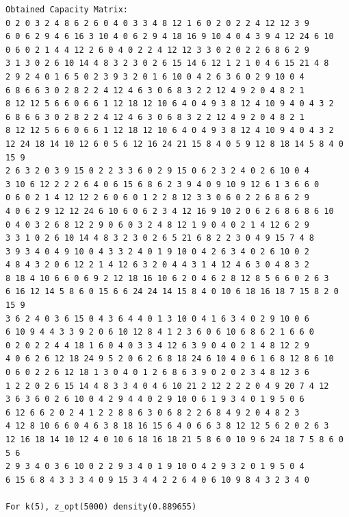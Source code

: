 \documentclass[11pt]{article}
\begin{document}
\begin{lstlisting}
Obtained Capacity Matrix:
0 2 0 3 2 4 8 6 2 6 0 4 0 3 3 4 8 12 1 6 0 2 0 2 2 4 12 12 3 9
6 0 6 2 9 4 6 16 3 10 4 0 6 2 9 4 18 16 9 10 4 0 4 3 9 4 12 24 6 10
0 6 0 2 1 4 4 12 2 6 0 4 0 2 2 4 12 12 3 3 0 2 0 2 2 6 8 6 2 9
3 1 3 0 2 6 10 14 4 8 3 2 3 0 2 6 15 14 6 12 1 2 1 0 4 6 15 21 4 8
2 9 2 4 0 1 6 5 0 2 3 9 3 2 0 1 6 10 0 4 2 6 3 6 0 2 9 10 0 4
6 8 6 6 3 0 2 8 2 2 4 12 4 6 3 0 6 8 3 2 2 12 4 9 2 0 4 8 2 1
8 12 12 5 6 6 0 6 6 1 12 18 12 10 6 4 0 4 9 3 8 12 4 10 9 4 0 4 3 2
6 8 6 6 3 0 2 8 2 2 4 12 4 6 3 0 6 8 3 2 2 12 4 9 2 0 4 8 2 1
8 12 12 5 6 6 0 6 6 1 12 18 12 10 6 4 0 4 9 3 8 12 4 10 9 4 0 4 3 2
12 24 18 14 10 12 6 0 5 6 12 16 24 21 15 8 4 0 5 9 12 8 18 14 5 8 4 0 15 9
2 6 3 2 0 3 9 15 0 2 2 3 3 6 0 2 9 15 0 6 2 3 2 4 0 2 6 10 0 4
3 10 6 12 2 2 2 6 4 0 6 15 6 8 6 2 3 9 4 0 9 10 9 12 6 1 3 6 6 0
0 6 0 2 1 4 12 12 2 6 0 6 0 1 2 2 8 12 3 3 0 6 0 2 2 6 8 6 2 9
4 0 6 2 9 12 12 24 6 10 6 0 6 2 3 4 12 16 9 10 2 0 6 2 6 8 6 8 6 10
0 4 0 3 2 6 8 12 2 9 0 6 0 3 2 4 8 12 1 9 0 4 0 2 1 4 12 6 2 9
3 3 1 0 2 6 10 14 4 8 3 2 3 0 2 6 5 21 6 8 2 2 3 0 4 9 15 7 4 8
3 9 3 4 0 4 9 10 0 4 3 3 2 4 0 1 9 10 0 4 2 6 3 4 0 2 6 10 0 2
4 8 4 3 2 0 6 12 2 1 4 12 6 3 2 0 4 4 3 1 4 12 4 6 3 0 4 8 3 2
8 18 4 10 6 6 0 6 9 2 12 18 16 10 6 2 0 4 6 2 8 12 8 5 6 6 0 2 6 3
6 16 12 14 5 8 6 0 15 6 6 24 24 14 15 8 4 0 10 6 18 16 18 7 15 8 2 0 15 9
3 6 2 4 0 3 6 15 0 4 3 6 4 4 0 1 3 10 0 4 1 6 3 4 0 2 9 10 0 6
6 10 9 4 4 3 3 9 2 0 6 10 12 8 4 1 2 3 6 0 6 10 6 8 6 2 1 6 6 0
0 2 0 2 2 4 4 18 1 6 0 4 0 3 3 4 12 6 3 9 0 4 0 2 1 4 8 12 2 9
4 0 6 2 6 12 18 24 9 5 2 0 6 2 6 8 18 24 6 10 4 0 6 1 6 8 12 8 6 10
0 6 0 2 2 6 12 18 1 3 0 4 0 1 2 6 8 6 3 9 0 2 0 2 3 4 8 12 3 6
1 2 2 0 2 6 15 14 4 8 3 3 4 0 4 6 10 21 2 12 2 2 2 0 4 9 20 7 4 12
3 6 3 6 0 2 6 10 0 4 2 9 4 4 0 2 9 10 0 6 1 9 3 4 0 1 9 5 0 6
6 12 6 6 2 0 2 4 1 2 2 8 8 6 3 0 6 8 2 2 6 8 4 9 2 0 4 8 2 3
4 12 8 10 6 6 0 4 6 3 8 18 16 15 6 4 0 6 6 3 8 12 12 5 6 2 0 2 6 3
12 16 18 14 10 12 4 0 10 6 18 16 18 21 5 8 6 0 10 9 6 24 18 7 5 8 6 0 5 6
2 9 3 4 0 3 6 10 0 2 2 9 3 4 0 1 9 10 0 4 2 9 3 2 0 1 9 5 0 4
6 15 6 8 4 3 3 3 4 0 9 15 3 4 4 2 2 6 4 0 6 10 9 8 4 3 2 3 4 0

For k(5), z_opt(5000) density(0.889655)


\end{lstlisting}
\end{document}
